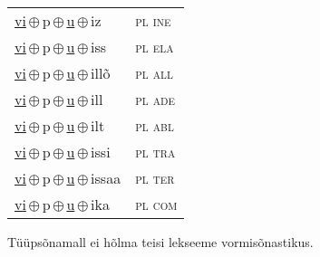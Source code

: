 \begin{minipage}{\textwidth}
\begin{sideways}
\begin{tabular}{l l}
\underline{vi}\,$\oplus$\,p\,$\oplus$\,\underline{u}\,$\oplus$\,iz & \textsc{ pl ine } \\
\underline{vi}\,$\oplus$\,p\,$\oplus$\,\underline{u}\,$\oplus$\,iss & \textsc{ pl ela } \\
\underline{vi}\,$\oplus$\,p\,$\oplus$\,\underline{u}\,$\oplus$\,illõ & \textsc{ pl all } \\
\underline{vi}\,$\oplus$\,p\,$\oplus$\,\underline{u}\,$\oplus$\,ill & \textsc{ pl ade } \\
\underline{vi}\,$\oplus$\,p\,$\oplus$\,\underline{u}\,$\oplus$\,ilt & \textsc{ pl abl } \\
\underline{vi}\,$\oplus$\,p\,$\oplus$\,\underline{u}\,$\oplus$\,issi & \textsc{ pl tra } \\
\underline{vi}\,$\oplus$\,p\,$\oplus$\,\underline{u}\,$\oplus$\,issaa & \textsc{ pl ter } \\
\underline{vi}\,$\oplus$\,p\,$\oplus$\,\underline{u}\,$\oplus$\,ika & \textsc{ pl com } \\
\end{tabular}
\end{sideways}
\label{tab:tüüpsõnamall-vipu}

\end{minipage}

 
\vspace{1em}
\noindent Tüüpsõnamall  ei hõlma teisi lekseeme vormi\-sõnastikus.
